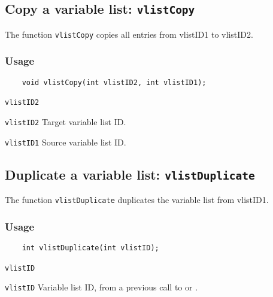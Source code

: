 \subsection{Copy a variable list: \texttt{vlistCopy}}
\label{vlistCopy}

The function {\texttt{vlistCopy}} copies all entries from vlistID1 to vlistID2.

\subsubsection*{Usage}

\begin{verbatim}
    void vlistCopy(int vlistID2, int vlistID1);
\end{verbatim}

\hspace*{4mm}\begin{minipage}[]{15cm}
\begin{deflist}{\texttt{vlistID2}\ }
\item[\texttt{vlistID2}]
Target variable list ID.
\item[\texttt{vlistID1}]
Source variable list ID.

\end{deflist}
\end{minipage}


\subsection{Duplicate a variable list: \texttt{vlistDuplicate}}
\label{vlistDuplicate}

The function {\texttt{vlistDuplicate}} duplicates the variable list from vlistID1.

\subsubsection*{Usage}

\begin{verbatim}
    int vlistDuplicate(int vlistID);
\end{verbatim}

\hspace*{4mm}\begin{minipage}[]{15cm}
\begin{deflist}{\texttt{vlistID}\ }
\item[\texttt{vlistID}]
Variable list ID, from a previous call to {} or {}.

\end{deflist}
\end{minipage}

